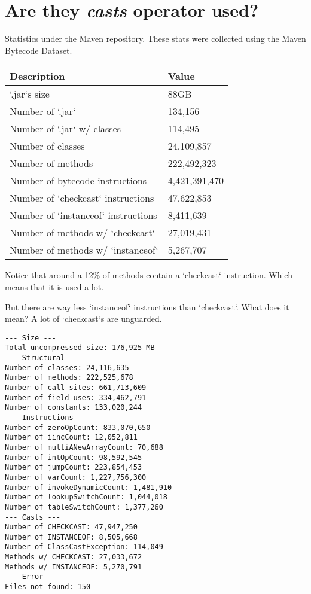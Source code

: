 \section{Are they \emph{casts} operator used? \label{orgb0b4e0e}}
\label{sec:orgb1d0eea}

Statistics under the Maven repository. 
These stats were collected using the Maven Bytecode Dataset. 

\begin{center}
\begin{tabular}{ll}
Description & Value\\
\hline
`.jar`s size & 88GB\\
Number of `.jar` & 134,156\\
Number of `.jar` w/ classes & 114,495\\
Number of classes & 24,109,857\\
Number of methods & 222,492,323\\
Number of bytecode instructions & 4,421,391,470\\
Number of `checkcast` instructions & 47,622,853\\
Number of `instanceof` instructions & 8,411,639\\
Number of methods w/ `checkcast` & 27,019,431\\
Number of methods w/ `instanceof` & 5,267,707\\
\end{tabular}
\end{center}

Notice that around a 12\% of methods contain a `checkcast` instruction. 
Which means that it is used a lot. 

But there are way less `instanceof` instructions than `checkcast`. 
What does it mean? 
A lot of `checkcast`s are unguarded. 

\begin{verbatim}
--- Size --- 
Total uncompressed size: 176,925 MB 
--- Structural --- 
Number of classes: 24,116,635 
Number of methods: 222,525,678 
Number of call sites: 661,713,609 
Number of field uses: 334,462,791 
Number of constants: 133,020,244 
--- Instructions --- 
Number of zeroOpCount: 833,070,650 
Number of iincCount: 12,052,811 
Number of multiANewArrayCount: 70,688 
Number of intOpCount: 98,592,545 
Number of jumpCount: 223,854,453 
Number of varCount: 1,227,756,300 
Number of invokeDynamicCount: 1,481,910 
Number of lookupSwitchCount: 1,044,018 
Number of tableSwitchCount: 1,377,260 
--- Casts --- 
Number of CHECKCAST: 47,947,250 
Number of INSTANCEOF: 8,505,668 
Number of ClassCastException: 114,049 
Methods w/ CHECKCAST: 27,033,672 
Methods w/ INSTANCEOF: 5,270,791 
--- Error --- 
Files not found: 150 
\end{verbatim}

